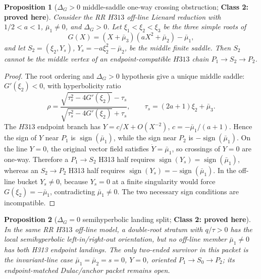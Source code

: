 \documentclass[11pt]{article}
\newtheorem{proposition}{Proposition}
\newcommand{\classtwo}{\textbf{Class 2: proved here}}
\begin{document}
\begin{proposition}[\(\Delta_G>0\) middle-saddle one-way crossing obstruction; \classtwo]\label{prop:delta-positive}
Consider the RR \(H313\) off-line Lienard reduction with \(1/2<a<1\), \(\bar\mu_1\ne0\), and \(\Delta_G>0\).  Let \(\xi_1<\xi_2<\xi_3\) be the three simple roots of
\[
  G(X)=(X+\bar\mu_3)(aX^2+\bar\mu_2)-\bar\mu_1,
\]
and let \(S_2=(\xi_2,Y_s)\), \(Y_s=-a\xi_2^2-\bar\mu_2\), be the middle finite saddle.  Then \(S_2\) cannot be the middle vertex of an endpoint-compatible \(H313\) chain \(P_1\to S_2\to P_2\).
\end{proposition}

\begin{proof}
The root ordering and \(\Delta_G>0\) hypothesis give a unique middle saddle: \(G'(\xi_2)<0\), with hyperbolicity ratio
\[
  \rho=\frac{\sqrt{\tau_s^2-4G'(\xi_2)}-\tau_s}
  {\sqrt{\tau_s^2-4G'(\xi_2)}+\tau_s},
  \qquad \tau_s=(2a+1)\xi_2+\bar\mu_3.
\]
The \(H313\) endpoint branch has \(Y=c/X+O(X^{-2})\), \(c=-\bar\mu_1/(a+1)\).  Hence the sign of \(Y\) near \(P_1\) is \(\operatorname{sign}(\bar\mu_1)\), while the sign near \(P_2\) is \(-\operatorname{sign}(\bar\mu_1)\).  On the line \(Y=0\), the original vector field satisfies \(\dot Y=\bar\mu_1\), so crossings of \(Y=0\) are one-way.  Therefore a \(P_1\to S_2\) H313 half requires \(\operatorname{sign}(Y_s)=\operatorname{sign}(\bar\mu_1)\), whereas an \(S_2\to P_2\) H313 half requires \(\operatorname{sign}(Y_s)=-\operatorname{sign}(\bar\mu_1)\).  In the off-line bucket \(Y_s\ne0\), because \(Y_s=0\) at a finite singularity would force \(G(\xi_2)=-\bar\mu_1\), contradicting \(\bar\mu_1\ne0\).  The two necessary sign conditions are incompatible.
\end{proof}

\begin{proposition}[\(\Delta_G=0\) semihyperbolic landing split; \classtwo]\label{prop:delta-zero}
In the same RR \(H313\) off-line model, a double-root stratum with \(q/\tau>0\) has the local semihyperbolic left-in/right-out orientation, but no off-line member \(\bar\mu_1\ne0\) has both H313 endpoint landings.  The only two-ended survivor in this packet is the invariant-line case \(\bar\mu_1=\bar\mu_2=s=0\), \(Y=0\), oriented \(P_1\to S_0\to P_2\); its endpoint-matched Dulac/anchor packet remains open.
\end{proposition}
\end{document}
